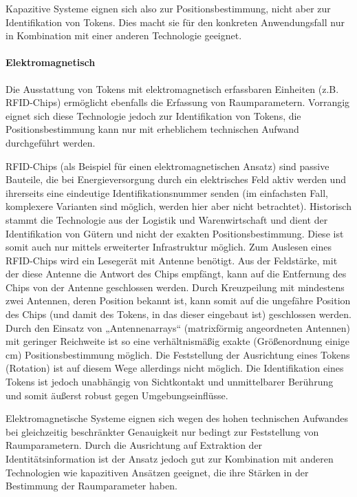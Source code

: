 Kapazitive Systeme eignen sich also zur Positionsbestimmung, nicht aber zur Identifikation von Tokens. Dies macht sie für den konkreten Anwendungsfall nur in Kombination mit einer anderen Technologie geeignet. 


\paragraph{Elektromagnetisch} %
\label{par:elektromagnetisch}
 
Die Ausstattung von Tokens mit elektromagnetisch erfassbaren Einheiten (z.B. \gls{RFID}-Chips) ermöglicht ebenfalls die Erfassung von Raumparametern. Vorrangig eignet sich diese Technologie jedoch zur Identifikation von Tokens, die Positionsbestimmung kann nur mit erheblichem technischen Aufwand durchgeführt werden.

RFID-Chips (als Beispiel für einen elektromagnetischen Ansatz) sind passive Bauteile, die bei Energieversorgung durch ein elektrisches Feld aktiv werden und ihrerseits eine eindeutige Identifikationsnummer senden (im einfachsten Fall, komplexere Varianten sind möglich, werden hier aber nicht betrachtet). Historisch stammt die Technologie aus der Logistik und Warenwirtschaft und dient der Identifikation von Gütern und nicht der exakten Positionsbestimmung. Diese ist somit auch nur mittels erweiterter Infrastruktur möglich. Zum Auslesen eines \gls{RFID}-Chips wird ein Lesegerät mit Antenne benötigt. Aus der Feldstärke, mit der diese Antenne die Antwort des Chips empfängt, kann auf die Entfernung des Chips von der Antenne geschlossen werden. Durch Kreuzpeilung mit mindestens zwei Antennen, deren Position bekannt ist, kann somit auf die ungefähre Position des Chips (und damit des Tokens, in das dieser eingebaut ist) geschlossen werden. Durch den Einsatz von „Antennenarrays“ (matrixförmig angeordneten Antennen) mit geringer Reichweite ist so eine verhältnismäßig exakte (Größenordnung einige cm) Positionsbestimmung möglich. Die Feststellung der Ausrichtung eines Tokens (Rotation) ist auf diesem Wege allerdings nicht möglich. Die Identifikation eines Tokens ist jedoch unabhängig von Sichtkontakt und unmittelbarer Berührung und somit äußerst robust gegen Umgebungseinflüsse.

Elektromagnetische Systeme eignen sich wegen des hohen technischen Aufwandes bei gleichzeitig beschränkter Genauigkeit nur bedingt zur Feststellung von Raumparametern. Durch die Ausrichtung auf Extraktion der Identitätsinformation ist der Ansatz jedoch gut zur Kombination mit anderen Technologien wie kapazitiven Ansätzen geeignet, die ihre Stärken in der Bestimmung der Raumparameter haben.
 
